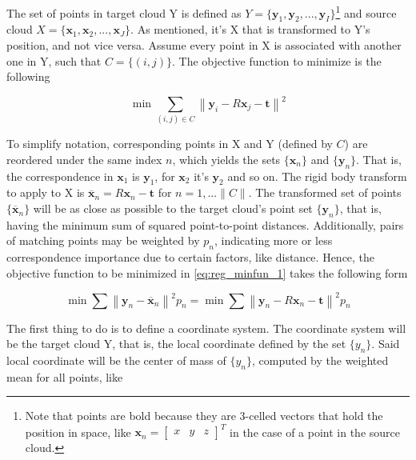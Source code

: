 \documentclass[../main.tex]{subfiles}
\begin{document}
The set of points in target cloud Y is defined as $Y=\{\boldsymbol{y}_{1}, \boldsymbol{y}_{2}, ..., \boldsymbol{y}_{I}\}$\footnote{Note that points are bold because they are 3-celled vectors that hold the position in space, like $\boldsymbol{x}_{n} = \begin{bmatrix} x & y & z \end{bmatrix}^{T}$ in the case of a point in the source cloud.} and source cloud $X=\{\boldsymbol{x}_{1}, \boldsymbol{x}_{2}, ..., \boldsymbol{x}_{J}\}$. As mentioned, it's X that is transformed to Y's position, and not vice versa. Assume every point in X is associated with another one in Y, such that $C=\{(i, j)\}$. The objective function to minimize is the following

\begin{equation} \label{eq:reg_minfun_1}
    \min \sum_{(i, j) \in C}\left\|\boldsymbol{y}_{i}-R \boldsymbol{x}_{j}-\boldsymbol{t}\right\|^{2}
\end{equation}

To simplify notation, corresponding points in X and Y (defined by $C$) are reordered under the same index $n$, which yields the sets $\{\boldsymbol{x}_{n}\}$ and $\{\boldsymbol{y}_{n}\}$. That is, the correspondence in $\boldsymbol{x}_{1}$ is $\boldsymbol{y}_{1}$, for $\boldsymbol{x}_{2}$ it's $\boldsymbol{y}_{2}$ and so on. The rigid body transform to apply to X is $\overline{\boldsymbol{x}}_{n} = R \boldsymbol{x}_{n}-\boldsymbol{t}$ for $n=1, ... \|C\|$. The transformed set of points $\{\overline{\boldsymbol{x}}_{n}\}$ will be as close as possible to the target cloud's point set $\{\boldsymbol{y}_{n}\}$, that is, having the minimum sum of squared point-to-point distances. Additionally, pairs of matching points may be weighted by $p_{n}$, indicating more or less correspondence importance due to certain factors, like distance. Hence, the objective function to be minimized in \ref{eq:reg_minfun_1} takes the following form

\begin{equation} \label{eq:reg_minfun_2}
    \min \sum\left\|\boldsymbol{y}_{n}-\overline{\boldsymbol{x}}_{n}\right\|^{2} p_{n} = \min \sum\left\|\boldsymbol{y}_{n} - R \boldsymbol{x}_{n}-\boldsymbol{t} \right\|^{2} p_{n}
\end{equation}

The first thing to do is to define a coordinate system. The coordinate system will be the target cloud Y, that is, the local coordinate defined by the set $\{y_{n}\}$. Said local coordinate will be the center of mass of $\{y_{n}\}$, computed by the weighted mean for all points, like
\end{document}
